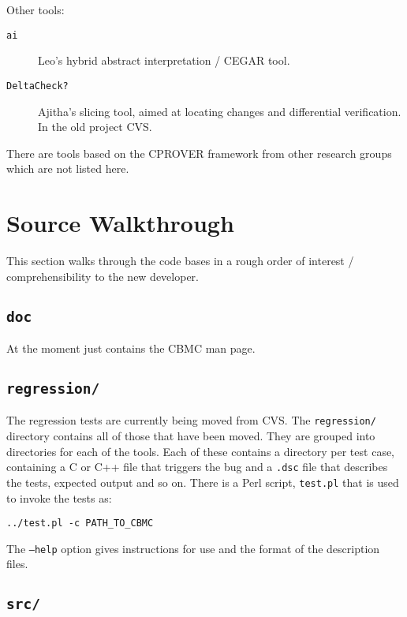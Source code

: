 \documentclass{article}
\newcommand{\dir}[1]{\texttt{#1}}
\newcommand{\file}[1]{\texttt{#1}}
\newcommand{\code}[1]{\texttt{#1}}
\newcommand{\prog}[1]{\texttt{#1}}
\begin{document}
Other tools:

\begin{description}
  \item[\prog{ai}]{Leo's hybrid abstract interpretation / CEGAR tool.}

  \item[\prog{DeltaCheck?}]{Ajitha's slicing tool, aimed at locating
    changes and differential verification.  In the old project CVS.}
\end{description}


There are tools based on the CPROVER framework from other research
groups which are not listed here.






\section{Source Walkthrough}

This section walks through the code bases in a rough order of interest
/ comprehensibility to the new developer.



\subsection{\dir{doc}}

At the moment just contains the CBMC man page.

\subsection{\dir{regression/}}

The regression tests are currently being moved from CVS.  The
\dir{regression/} directory contains all of those that have been
moved.  They are grouped into directories for each of the tools.  Each
of these contains a directory per test case, containing a C or C++
file that triggers the bug and a \file{.dsc} file that describes the
tests, expected output and so on.  There is a Perl script,
\file{test.pl} that is used to invoke the tests as:

\begin{center}
  \code{../test.pl -c PATH\_TO\_CBMC}
\end{center}

The \code{--help} option gives instructions for use and the format of
the description files.



\subsection{\dir{src/}}
\end{document}
